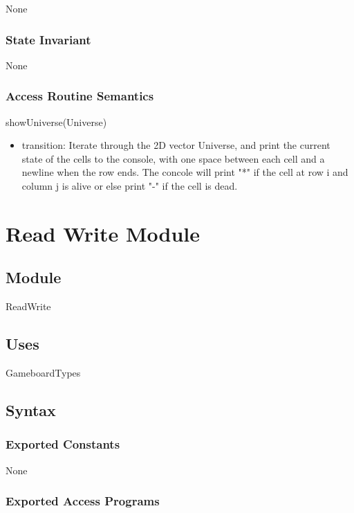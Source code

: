 \documentclass[12pt]{article}
\begin{document}
None

\subsubsection* {State Invariant}

None

\subsubsection* {Access Routine Semantics}

\noindent showUniverse(Universe)
\begin{itemize}
\item transition: Iterate through the 2D vector Universe, and print the current state of the cells to the console, with one space between each cell and a newline when the row ends.
	The concole will print "*" if the cell at row i and column j is alive or else print "-" if the cell is dead.

\end{itemize}
\newpage

\section* {Read Write Module}

\subsection* {Module}

ReadWrite 

\subsection* {Uses}

GameboardTypes

\subsection* {Syntax}

\subsubsection* {Exported Constants}

None

\subsubsection* {Exported Access Programs}
\end{document}
